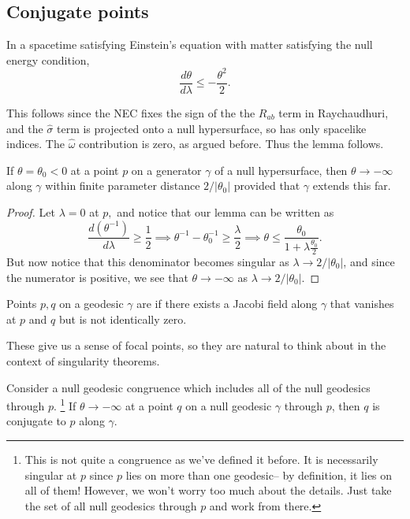 \subsection*{Conjugate points}
\begin{lem}
In a spacetime satisfying Einstein's equation with matter satisfying the null energy condition,
\begin{equation}
    \frac{d\theta}{d\lambda}\leq -\frac{\theta^2}{2}.
\end{equation}
\end{lem}
This follows since the NEC fixes the sign of the the $R_{ab}$ term in Raychaudhuri, and the $\hat \sigma$ term is projected onto a null hypersurface, so has only spacelike indices. The $\hat \omega$ contribution is zero, as argued before. Thus the lemma follows.
\begin{cor}
    If $\theta=\theta_0 <0$ at a point $p$ on a generator $\gamma$ of a null hypersurface, then $\theta \to -\infty$ along $\gamma$ within finite parameter distance $2/|\theta_0|$  provided that $\gamma$ extends this far.
\end{cor}
\begin{proof}
    Let $\lambda=0$ at $p,$ and notice that our lemma can be written as
    \begin{equation}
        \frac{d(\theta^{-1})}{d\lambda} \geq \frac{1}{2} \implies \theta^{-1} -\theta_0^{-1}\geq \frac{\lambda}{2}\implies \theta \leq \frac{\theta_0}{1+\lambda\frac{\theta_0}{2}}.
    \end{equation}
    But now notice that this denominator becomes singular as $\lambda \to 2/|\theta_0|$, and since the numerator is positive, we see that $\theta\to -\infty$ as $\lambda\to 2/|\theta_0|$.
\end{proof}
\begin{defn}
    Points $p,q$ on a geodesic $\gamma$ are  if there exists a Jacobi field along $\gamma$ that vanishes at $p$ and $q$ but is not identically zero.
\end{defn}
These give us a sense of focal points, so they are natural to think about in the context of singularity theorems.
\begin{thm}\label{conjugatepoints}
    Consider a null geodesic congruence which includes all of the null geodesics through $p$.%
        \footnote{This is not quite a congruence as we've defined it before. It is necessarily singular at $p$ since $p$ lies on more than one geodesic-- by definition, it lies on all of them! However, we won't worry too much about the details. Just take the set of all null geodesics through $p$ and work from there.}
    If $\theta \to -\infty$ at a point $q$ on a null geodesic $\gamma$ through $p$, then $q$ is conjugate to $p$ along $\gamma$.
\end{thm}
